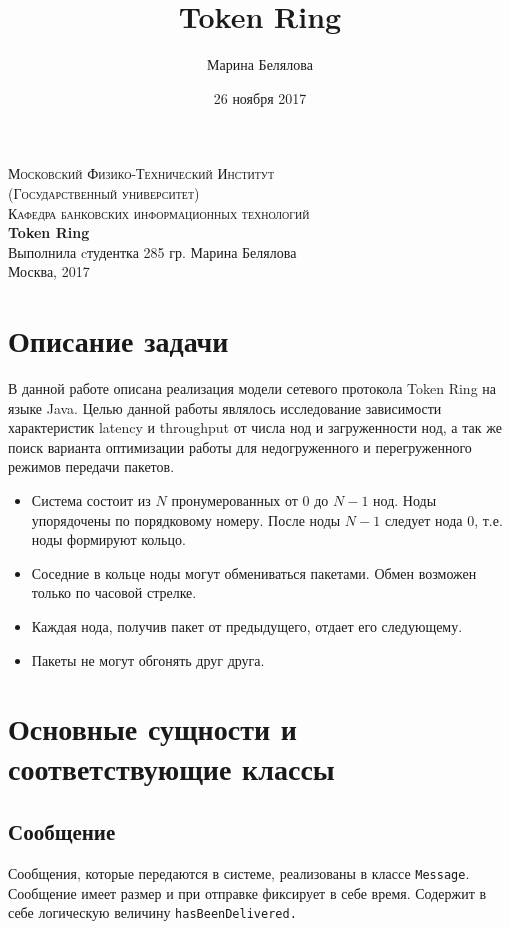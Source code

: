 \documentclass{article}
\title{Token Ring}
\author{Марина Белялова}
\date{26 ноября 2017}
\begin{document}
\begin{center}


\textsc{\Large Московский Физико-Технический Институт \\ (Государственный университет)}\\[1cm]
\textsc{\normalsize Кафедра банковских информационных технологий}\\[4cm]
{ \huge \bfseries Token Ring \\[1cm] }
\textnormal{\normalsize Выполнила cтудентка 285 гр. Марина Белялова}\\[10cm]
\textnormal{Москва, 2017}
\end{center}


\newpage

\tableofcontents

\newpage
\section{Описание задачи}
В данной работе описана реализация модели сетевого протокола Token Ring на языке Java. Целью данной работы являлось исследование зависимости характеристик latency и throughput от числа нод и загруженности нод, а так же поиск варианта оптимизации работы для недогруженного и перегруженного режимов передачи пакетов.

\begin{itemize}
\item Система состоит из $N$ пронумерованных от $0$ до $N-1$ нод. Ноды упорядочены по порядковому номеру. После ноды $N-1$ следует нода $0$, т.е. ноды формируют кольцо. 
\item Соседние в кольце ноды могут обмениваться пакетами. Обмен возможен только по часовой стрелке. 
\item Каждая нода, получив пакет от предыдущего, отдает его следующему.
\item Пакеты не могут обгонять друг друга.
\end{itemize}

\section{Основные сущности и соответствующие классы}
\subsection{Сообщение}
Сообщения, которые передаются в системе, реализованы в классе \lstinline|Message|. Сообщение имеет размер и при отправке фиксирует в себе время. Содержит в себе логическую величину
\lstinline|hasBeenDelivered.|
\end{document}
